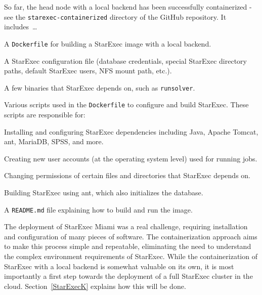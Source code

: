 \documentclass{easychair}
\newenvironment{packed_itemize}{
\vspace*{-0.3em}
\begin{itemize}
\setlength{\partopsep}{0pt}
\setlength{\itemsep}{1pt}
\setlength{\parskip}{0pt}
\setlength{\parsep}{0pt}
}{\end{itemize}}
\newcommand{\dav}[1]{{\color{red}{David: {#1}}}}
\begin{document}
So far, the head node with a local backend has been successfully containerized - see the
{\tt starexec-containerized} directory of the GitHub repository.
It includes~\ldots
\begin{packed_itemize}
\item A {\tt Dockerfile} for building a StarExec image with a local backend.
\item A StarExec configuration file (database credentials, special StarExec directory paths, 
      default StarExec users, NFS mount path, etc.).
\item A few binaries that StarExec depends on, such as {\tt runsolver}.
\item Various scripts used in the {\tt Dockerfile} to configure and build StarExec.
      These scripts are responsible for: 
      \begin{packed_itemize}
      \item Installing and configuring StarExec dependencies including Java, Apache Tomcat, ant, 
            MariaDB, SPSS, and more.
      \item Creating new user accounts (at the operating system level) used for running jobs.
      \item Changing permissions of certain files and directories that StarExec depends on.
      \item Building StarExec using ant, which also initializes the database.
      \end{packed_itemize}
\item A {\tt README.md} file explaining how to build and run the image.
\end{packed_itemize}

The deployment of StarExec Miami was a real challenge, requiring installation and configuration 
of many pieces of software.
The containerization approach aims to make this process simple and repeatable, eliminating the 
need to understand the complex environment requirements of StarExec. 
While the containerization of StarExec with a local backend is somewhat valuable on its own,
it is most importantly a first step towards the deployment of a full StarExec cluster in the cloud.
Section~\ref{StarExecK} explains how this will be done.

\end{document}
